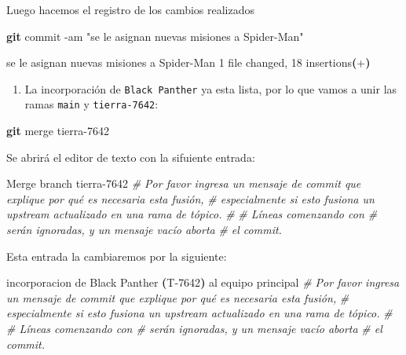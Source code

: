 \documentclass[
]{book}
\newenvironment{Shaded}{\begin{snugshade}}{\end{snugshade}}
\newcommand{\AttributeTok}[1]{\textcolor[rgb]{0.13,0.29,0.53}{#1}}
\newcommand{\CommentTok}[1]{\textcolor[rgb]{0.56,0.35,0.01}{\textit{#1}}}
\newcommand{\ErrorTok}[1]{\textcolor[rgb]{0.64,0.00,0.00}{\textbf{#1}}}
\newcommand{\ExtensionTok}[1]{#1}
\newcommand{\FunctionTok}[1]{\textcolor[rgb]{0.13,0.29,0.53}{\textbf{#1}}}
\newcommand{\KeywordTok}[1]{\textcolor[rgb]{0.13,0.29,0.53}{\textbf{#1}}}
\newcommand{\NormalTok}[1]{#1}
\newcommand{\StringTok}[1]{\textcolor[rgb]{0.31,0.60,0.02}{#1}}
\providecommand{\tightlist}{%
  \setlength{\itemsep}{0pt}\setlength{\parskip}{0pt}}
\begin{document}
Luego hacemos el registro de los cambios realizados

\begin{Shaded}
\begin{Highlighting}[]
\FunctionTok{git}\NormalTok{ commit }\AttributeTok{{-}am} \StringTok{"se le asignan nuevas misiones a Spider{-}Man"} 
\end{Highlighting}
\end{Shaded}

\begin{Shaded}
\begin{Highlighting}[]
\ExtensionTok{[main}\NormalTok{ bd81998] se le asignan nuevas misiones a Spider{-}Man}
 \ExtensionTok{1}\NormalTok{ file changed, 18 insertions}\ErrorTok{(}\ExtensionTok{+}\KeywordTok{)}
\end{Highlighting}
\end{Shaded}

\begin{enumerate}
\def\labelenumi{\arabic{enumi}.}
\setcounter{enumi}{6}
\tightlist
\item
  La incorporación de \texttt{Black\ Panther} ya esta lista, por lo que vamos a unir las ramas \texttt{main} y \texttt{tierra-7642}:
\end{enumerate}

\begin{Shaded}
\begin{Highlighting}[]
\FunctionTok{git}\NormalTok{ merge tierra{-}7642}
\end{Highlighting}
\end{Shaded}

Se abrirá el editor de texto con la sifuiente entrada:

\begin{Shaded}
\begin{Highlighting}[]
\ExtensionTok{Merge}\NormalTok{ branch }\StringTok{\textquotesingle{}tierra{-}7642\textquotesingle{}}
\CommentTok{\# Por favor ingresa un mensaje de commit que explique por qué es necesaria esta fusión,}
\CommentTok{\# especialmente si esto fusiona un upstream actualizado en una rama de tópico.}
\CommentTok{\#}
\CommentTok{\# Líneas comenzando con \textquotesingle{}\#\textquotesingle{} serán ignoradas, y un mensaje vacío aborta}
\CommentTok{\# el commit.}
\end{Highlighting}
\end{Shaded}

Esta entrada la cambiaremos por la siguiente:

\begin{Shaded}
\begin{Highlighting}[]
\ExtensionTok{incorporacion}\NormalTok{ de Black Panther }\ErrorTok{(}\ExtensionTok{T{-}7642}\KeywordTok{)} \ExtensionTok{al}\NormalTok{ equipo principal}
\CommentTok{\# Por favor ingresa un mensaje de commit que explique por qué es necesaria esta fusión,}
\CommentTok{\# especialmente si esto fusiona un upstream actualizado en una rama de tópico.}
\CommentTok{\#}
\CommentTok{\# Líneas comenzando con \textquotesingle{}\#\textquotesingle{} serán ignoradas, y un mensaje vacío aborta}
\CommentTok{\# el commit.}
\end{Highlighting}
\end{Shaded}
\end{document}
